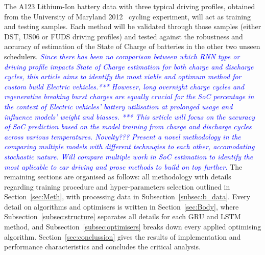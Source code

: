 The A123 Lithium-Ion battery data with three typical driving profiles, obtained from the University of Maryland 2012~\cite{noauthor_calce_2017} cycling experiment, will act as training and testing samples.
Each method will be validated through those samples (either DST, US06 or FUDS driving profiles) and tested against the robustness and accuracy of estimation of the State of Charge of batteries in the other two unseen schedulers.
\textcolor{blue}{\textit{
Since there has been no comparison between which RNN type or driving profile impacts State of Charge estimation for both charge and discharge cycles, this article aims to identify the most viable and optimum method for custom build Electric vehicles.***
However, long overnight charge cycles and regenerative breaking burst charges are equally crucial for the SoC percentage in the context of Electric vehicles' battery utilisation at prolonged usage and influence models' weight and biasses. ***
This article will focus on the accuracy of SoC prediction based on the model training from charge and discharge cycles across various temperatures.
Novelty??? Present a novel methodology in the comparing multiple models with different technuqies to each other, accomodating stochastic nature.
Will compare multiple work in SoC estimation to identify the most aplicable to car driving and prose methods to build on top further.
}}
%
%
The remaining sections are organised as follows: all methodology with details regarding training procedure and hyper-parameters selection outlined in Section~\ref{sec:Meth}, with processing data in Subsection~\ref{subsec:b_data}.
Every detail on algorithms and optimisers is written in Section~\ref{sec:Body}, where Subsection~\ref{subsec:structure} separates all details for each GRU and LSTM method, and Subsection~\ref{subsec:optimisers} breaks down every applied optimising algorithm.
Section~\ref{sec:conclussion} gives the results of implementation and performance characteristics and concludes the critical analysis.
